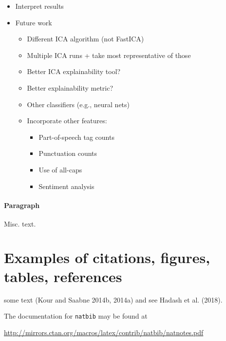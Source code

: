 \documentclass{article}
\begin{document}
\label{sec:discuss}

\begin{itemize}
\tightlist
\item
  Interpret results
\item
  Future work

  \begin{itemize}
  \tightlist
  \item
    Different ICA algorithm (not FastICA)
  \item
    Multiple ICA runs + take most representative of those
  \item
    Better ICA explainability tool?
  \item
    Better explainability metric?
  \item
    Other classifiers (e.g., neural nets)
  \item
    Incorporate other features:

    \begin{itemize}
    \tightlist
    \item
      Part-of-speech tag counts
    \item
      Punctuation counts
    \item
      Use of all-caps
    \item
      Sentiment analysis
    \end{itemize}
  \end{itemize}
\end{itemize}

\paragraph{Paragraph}

Misc. text.

\hypertarget{examples-of-citations-figures-tables-references}{%
\section{Examples of citations, figures, tables,
references}\label{examples-of-citations-figures-tables-references}}

\label{sec:others}

some text (Kour and Saabne 2014b, 2014a) and see Hadash et al. (2018).

The documentation for \verb+natbib+ may be found at

\begin{center}
  \url{http://mirrors.ctan.org/macros/latex/contrib/natbib/natnotes.pdf}
\end{center}
\end{document}
